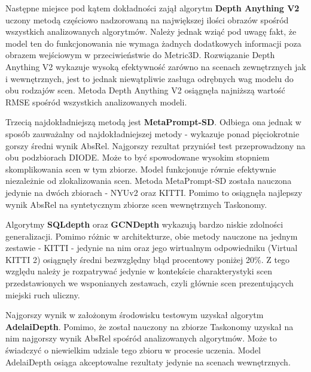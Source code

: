 Następne miejsce pod kątem dokładności zajął algorytm \textbf{Depth Anything V2} uczony metodą częściowo nadzorowaną na największej ilości obrazów spośród wszystkich analizowanych algorytmów. Należy jednak wziąć pod uwagę fakt, że model ten do funkcjonowania nie wymaga żadnych dodatkowych informacji poza obrazem wejściowym w przeciwieństwie do Metric3D. Rozwiązanie Depth Anything V2 wykazuje wysoką efektywność zarówno na scenach zewnętrznych jak i wewnętrznych, jest to jednak niewątpliwie zasługa odrębnych wag modelu do obu rodzajów scen. Metoda Depth Anything V2 osiągnęła najniższą wartość RMSE spośród wszystkich analizowanych modeli.

Trzecią najdokładniejszą metodą jest \textbf{MetaPrompt-SD}. Odbiega ona jednak w sposób zauważalny od najdokładniejszej metody - wykazuje ponad pięciokrotnie gorszy średni wynik AbsRel. Najgorszy rezultat przyniósł test przeprowadzony na obu podzbiorach DIODE. Może to być spowodowane wysokim stopniem skomplikowania scen w tym zbiorze. Model funkcjonuje równie efektywnie niezależnie od zlokalizowania scen. Metoda MetaPrompt-SD została nauczona jedynie na dwóch zbiorach - NYUv2 oraz KITTI. Pomimo to osiągnęła najlepszy wynik AbsRel na syntetycznym zbiorze scen wewnętrznych Taskonomy.

Algorytmy \textbf{SQLdepth} oraz \textbf{GCNDepth} wykazują bardzo niskie zdolności generalizacji. Pomimo różnic w architekturze, obie metody nauczone na jednym zestawie - KITTI - jedynie na nim oraz jego wirtualnym odpowiedniku (Virtual KITTI 2) osiągnęły średni bezwzględny błąd procentowy poniżej 20\%. Z tego względu należy je rozpatrywać jedynie w kontekście charakterystyki scen przedstawionych we wsponianych zestawach, czyli głównie scen prezentujących miejski ruch uliczny.

Najgorszy wynik w założonym środowisku testowym uzyskał algorytm \textbf{AdelaiDepth}. Pomimo, że został nauczony na zbiorze Taskonomy uzyskał na nim najgorszy wynik AbsRel spośród analizowanych algorytmów. Może to świadczyć o niewielkim udziale tego zbioru w procesie uczenia. Model AdelaiDepth osiąga akceptowalne rezultaty jedynie na scenach wewnętrznych.

